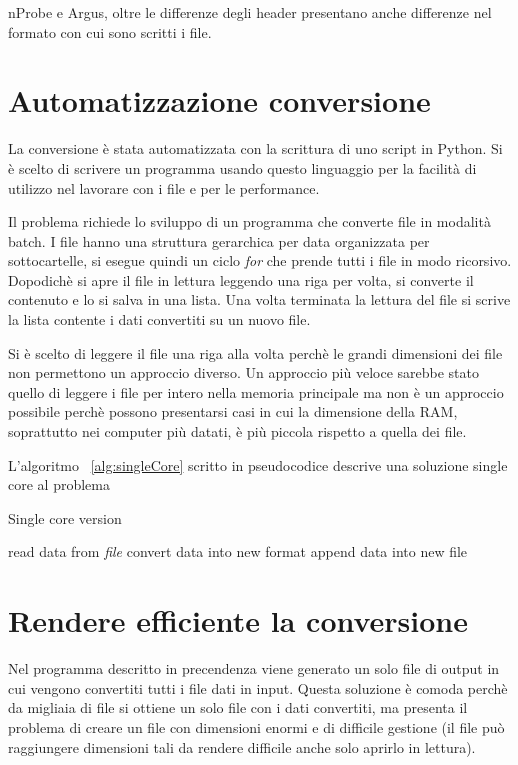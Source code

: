 \documentclass[../main.tex]{subfiles}
\begin{document}
nProbe e Argus, oltre le differenze degli header presentano anche differenze nel formato con cui sono scritti i file.



\section{Automatizzazione conversione}
La conversione è stata automatizzata con la scrittura di uno script in Python. Si è scelto di scrivere un programma usando questo linguaggio per la facilità di utilizzo nel lavorare con i file e per le performance.

Il problema richiede lo sviluppo di un programma che converte file in modalità batch.
I file hanno una struttura gerarchica per data organizzata per sottocartelle, si esegue quindi un ciclo \textit{for} che prende tutti i file in modo ricorsivo.
Dopodichè si apre il file in lettura leggendo una riga per volta, si converte il contenuto e lo si salva in una lista. Una volta terminata la lettura del file si scrive la lista contente i dati convertiti su un nuovo file.

Si è scelto di leggere il file una riga alla volta perchè le grandi dimensioni dei file non permettono un approccio diverso. Un approccio più veloce sarebbe stato quello di leggere i file per intero nella memoria principale ma non è un approccio possibile perchè possono presentarsi casi in cui la dimensione della RAM, soprattutto nei computer più datati, è più piccola rispetto a quella dei file.

L'algoritmo ~\ref{alg:singleCore} scritto in pseudocodice descrive una soluzione single core al problema

\begin{algorithm}
\caption{Single core version}
				\label{alg:singleCore}
\begin{algorithmic}[1]
\State read data from \textit{file}
\State convert data into new format
\State append data into new file
\EndFor

\EndProcedure
\end{algorithmic}
\end{algorithm}

\section{Rendere efficiente la conversione}

Nel programma descritto in precendenza viene generato un solo file di output in cui vengono convertiti tutti i file dati in input. Questa soluzione è comoda perchè da migliaia di file si ottiene un solo file con i dati convertiti, ma presenta il problema di creare un file con dimensioni enormi e di difficile gestione (il file può raggiungere dimensioni tali da rendere difficile anche solo aprirlo in lettura).
\end{document}
